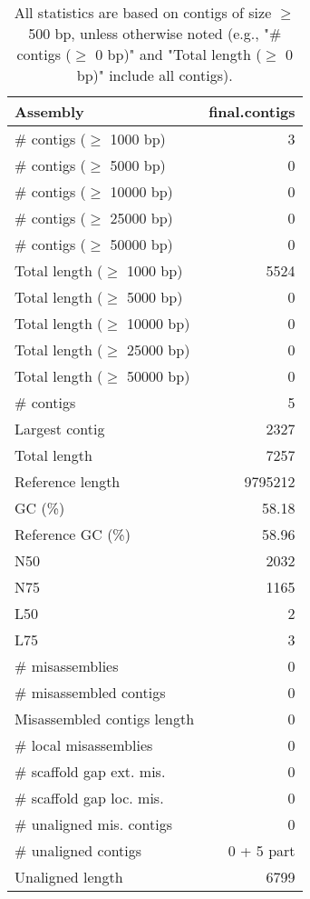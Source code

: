 \documentclass[12pt,a4paper]{article}
\begin{document}
\begin{table}[ht]
\begin{center}
\caption{All statistics are based on contigs of size $\geq$ 500 bp, unless otherwise noted (e.g., "\# contigs ($\geq$ 0 bp)" and "Total length ($\geq$ 0 bp)" include all contigs).}
\begin{tabular}{|l*{1}{|r}|}
\hline
Assembly & final.contigs \\ \hline
\# contigs ($\geq$ 1000 bp) & 3 \\ \hline
\# contigs ($\geq$ 5000 bp) & 0 \\ \hline
\# contigs ($\geq$ 10000 bp) & 0 \\ \hline
\# contigs ($\geq$ 25000 bp) & 0 \\ \hline
\# contigs ($\geq$ 50000 bp) & 0 \\ \hline
Total length ($\geq$ 1000 bp) & 5524 \\ \hline
Total length ($\geq$ 5000 bp) & 0 \\ \hline
Total length ($\geq$ 10000 bp) & 0 \\ \hline
Total length ($\geq$ 25000 bp) & 0 \\ \hline
Total length ($\geq$ 50000 bp) & 0 \\ \hline
\# contigs & 5 \\ \hline
Largest contig & 2327 \\ \hline
Total length & 7257 \\ \hline
Reference length & 9795212 \\ \hline
GC (\%) & 58.18 \\ \hline
Reference GC (\%) & 58.96 \\ \hline
N50 & 2032 \\ \hline
N75 & 1165 \\ \hline
L50 & 2 \\ \hline
L75 & 3 \\ \hline
\# misassemblies & 0 \\ \hline
\# misassembled contigs & 0 \\ \hline
Misassembled contigs length & 0 \\ \hline
\# local misassemblies & 0 \\ \hline
\# scaffold gap ext. mis. & 0 \\ \hline
\# scaffold gap loc. mis. & 0 \\ \hline
\# unaligned mis. contigs & 0 \\ \hline
\# unaligned contigs & 0 + 5 part \\ \hline
Unaligned length & 6799 \\ \hline

\end{tabular}
\end{center}
\end{table}
\end{document}
